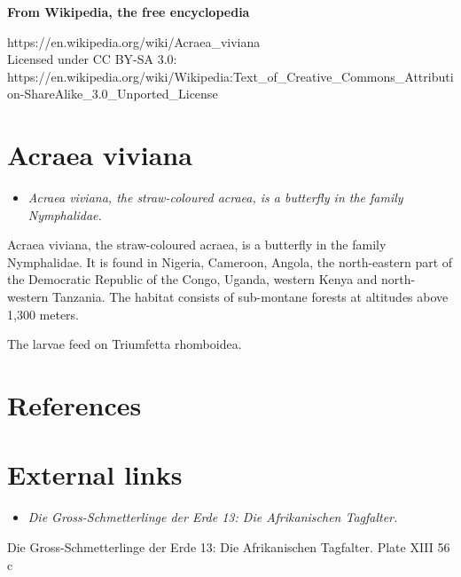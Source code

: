 \textbf{From Wikipedia, the free encyclopedia}

https://en.wikipedia.org/wiki/Acraea\_viviana\\
Licensed under CC BY-SA 3.0:\\
https://en.wikipedia.org/wiki/Wikipedia:Text\_of\_Creative\_Commons\_Attribution-ShareAlike\_3.0\_Unported\_License

\section{Acraea viviana}\label{acraea-viviana}

\begin{itemize}
\item
  \emph{Acraea viviana, the straw-coloured acraea, is a butterfly in the
  family Nymphalidae.}
\end{itemize}

Acraea viviana, the straw-coloured acraea, is a butterfly in the family
Nymphalidae. It is found in Nigeria, Cameroon, Angola, the north-eastern
part of the Democratic Republic of the Congo, Uganda, western Kenya and
north-western Tanzania. The habitat consists of sub-montane forests at
altitudes above 1,300 meters.

The larvae feed on Triumfetta rhomboidea.

\section{References}\label{references}

\section{External links}\label{external-links}

\begin{itemize}
\item
  \emph{Die Gross-Schmetterlinge der Erde 13: Die Afrikanischen
  Tagfalter.}
\end{itemize}

Die Gross-Schmetterlinge der Erde 13: Die Afrikanischen Tagfalter. Plate
XIII 56 c
